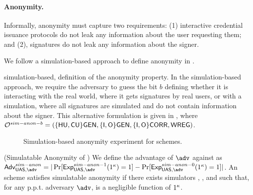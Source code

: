 \paragraph{Anonymity.} %
Informally, anonymity must capture two requirements: (1) interactive credential
issuance protocols do not leak any information about the user requesting them;
and (2), signatures do not leak any information about the signer.

We follow a simulation-based approach to define anonymity in \UAS. 

simulation-based, definition of the
anonymity property. In the simulation-based approach, we require the adversary
to guess the bit $b$ defining whether it is interacting with the real world,
where it gets signatures by real users, or with a simulation, where all
signatures are simulated and do not contain information about the signer.
This alternative formulation is given in , where
$\mathcal{O}^{sim-anon-b} = (\lbrace\mathsf{HU},\mathsf{CU}\rbrace\mathsf{GEN},\lbrace\mathsf{I},\mathsf{O}\rbrace\mathsf{GEN},\lbrace\mathsf{I},
\mathsf{O}\rbrace\mathsf{CORR},\mathsf{WREG})$.

\begin{figure}[htp!]

  \centering
  
  \caption{Simulation-based anonymity experiment for \UAS schemes.}
  \label{fig:exp-uas-simanon}
\end{figure}

\begin{definition}{(Simulatable Anonymity of \UAS)}
  \label{def:sim-anonymity-uas}  
  We define the advantage \AdvSimAnon of $\adv$ against \ExpSimAnonb as
  $\AdvSimAnon=|\Pr\lbrack\ExpSimAnono(1^\secpar)=1\rbrack-
  \Pr\lbrack\ExpSimAnonz(1^\secpar)=1\rbrack|$.
  An \UAS scheme satisfies simulatable anonymity if there exists simulators
  \SIMSETUP, \SIMOBTAIN, \SIMSIGN and \SIMOPEN such that, for any p.p.t.
  adversary $\adv$, \AdvSimAnon is a negligible function of $1^\kappa$.
\end{definition}

